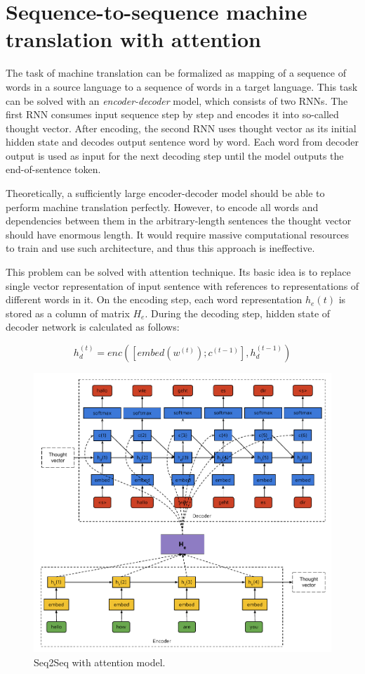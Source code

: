 \section{Sequence-to-sequence machine translation with attention}
The task of machine translation can be formalized as mapping of a sequence of words in a source language to a sequence of words in a target language. This task can be solved with an \emph{encoder-decoder} model, which consists of two RNNs. The first RNN consumes input sequence step by step and encodes it into so-called thought vector. After encoding, the second RNN uses thought vector as its initial hidden state and decodes output sentence word by word.  Each word from decoder output is used as input for the next decoding step until the model outputs the end-of-sentence token. 

Theoretically, a sufficiently large encoder-decoder model should be able to perform machine translation perfectly. However, to encode all words and dependencies between them in the arbitrary-length sentences the thought vector should have enormous length. It would require massive computational resources to train and use such architecture, and thus this approach is ineffective.

This problem can be solved with attention technique. Its basic idea is to replace single vector representation of input sentence with references to representations of different words in it. On the encoding step, each word representation $h_e(t)$ is stored as a column of matrix $H_e$. During the decoding step, hidden state of decoder network is calculated as follows:

\begin{equation}
h_d^{(t)} = enc([embed(w^{(t)});c^{(t-1)}], h_d^{(t-1)})
\label{attn:hd}
\end{equation}

\begin{figure}
\centering
\includegraphics[width=5in]{Figures/seq2seq.pdf}
\decoRule
\caption[Seq2Seq model]{Seq2Seq with attention model.}
\label{fig:seq2seq}
\end{figure}

